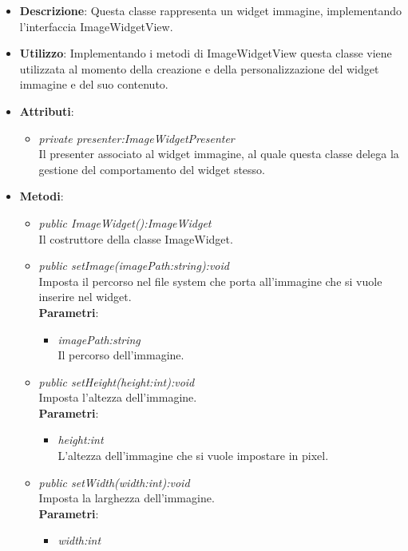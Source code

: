 \begin{itemize}
\item \textbf{Descrizione}: Questa classe rappresenta un widget immagine, implementando l'interfaccia ImageWidgetView.
\item \textbf{Utilizzo}: Implementando i metodi di ImageWidgetView questa classe viene utilizzata al momento della creazione e della personalizzazione del widget immagine e del suo contenuto.
\item \textbf{Attributi}:
	\begin{itemize}
	\item \textit{private presenter:ImageWidgetPresenter}\\
	Il presenter associato al widget immagine, al quale questa classe delega la gestione del comportamento del widget stesso.
	\end{itemize}
\item \textbf{Metodi}:
	\begin{itemize}
	\item \textit{public ImageWidget():ImageWidget}\\
	Il costruttore della classe ImageWidget.
	\item \textit{public setImage(imagePath:string):void}\\
	Imposta il percorso nel file system che porta all'immagine che si vuole inserire nel widget.
		\\ \textbf{Parametri}: \begin{itemize}
		\item \textit{imagePath:string}\\
		Il percorso dell'immagine.
		\end{itemize} 
	\item \textit{public setHeight(height:int):void}\\
	Imposta l'altezza dell'immagine.
		\\ \textbf{Parametri}: \begin{itemize}
		\item \textit{height:int}\\
		L'altezza dell'immagine che si vuole impostare in pixel.
		\end{itemize} 
	\item \textit{public setWidth(width:int):void}\\
	Imposta la larghezza dell'immagine.
		\\ \textbf{Parametri}: \begin{itemize}
		\item \textit{width:int}\\

\end{itemize}
\end{itemize}
\end{itemize}
